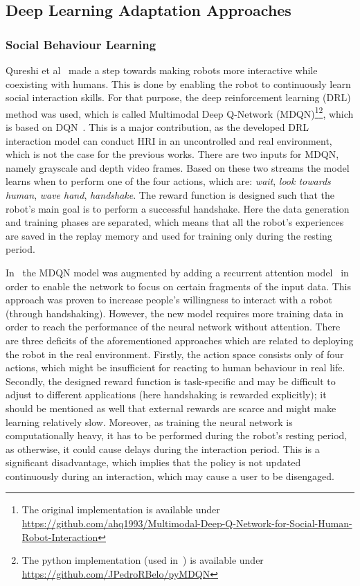 \documentclass[thesis]{mas_proposal}
\begin{document}
\subsection{Deep Learning Adaptation Approaches}

\subsubsection{Social Behaviour Learning}
Qureshi et al~\cite{Qureshi2016} made a step towards making robots more interactive while coexisting with humans. This is done by enabling the robot to continuously learn social interaction skills. For that purpose, the deep reinforcement learning (DRL) method was used, which is called Multimodal Deep Q-Network (MDQN)\footnote{The original implementation is available under \url{https://github.com/ahq1993/Multimodal-Deep-Q-Network-for-Social-Human-Robot-Interaction}}\footnote{The python implementation (used in~\cite{Belo2021}) is available under \url{https://github.com/JPedroRBelo/pyMDQN}}, which is based on DQN~\cite{mnih2015human}. This is a major contribution, as the developed DRL interaction model can conduct HRI in an uncontrolled and real environment, which is not the case for the previous works. There are two inputs for MDQN, namely grayscale and depth video frames. Based on these two streams the model learns when to perform one of the four actions, which are: \emph{wait}, \emph{look towards human}, \emph{wave hand}, \emph{handshake}. The reward function is designed such that the robot's main goal is to perform a successful handshake. Here the data generation and training phases are separated, which means that all the robot's experiences are saved in the replay memory and used for training only during the resting period. 

In~\cite{Qureshi2017} the MDQN model was augmented by adding a recurrent attention model~\cite{sorokin2015deep} in order to enable the network to focus on certain fragments of the input data. This approach was proven to increase people's willingness to interact with a robot (through handshaking). However, the new model requires more training data in order to reach the performance of the neural network without attention. There are three deficits of the aforementioned approaches which are related to deploying the robot in the real environment. Firstly, the action space consists only of four actions, which might be insufficient for reacting to human behaviour in real life. Secondly, the designed reward function is task-specific and may be difficult to adjust to different applications (here handshaking is rewarded explicitly); it should be mentioned as well that external rewards are scarce and might make learning relatively slow. Moreover, as training the neural network is computationally heavy, it has to be performed during the robot's resting period, as otherwise, it could cause delays during the interaction period. This is a significant disadvantage, which implies that the policy is not updated continuously during an interaction, which may cause a user to be disengaged. 
\end{document}
